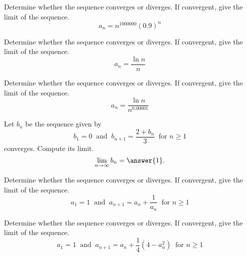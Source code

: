 \documentclass{ximera}
\begin{document}
\begin{exercise}
Determine whether the sequence converges or diverges. If convergent, give the limit of the sequence. 
\[ a_n = n^{1000000} (0.9)^n \]
\begin{multipleChoice}
\end{multipleChoice}
\end{exercise}

\begin{exercise}
Determine whether the sequence converges or diverges. If convergent, give the limit of the sequence. 
\[ a_n = \frac{\ln n}{n} \]
\begin{multipleChoice}
\end{multipleChoice}
\end{exercise}

\begin{exercise}
Determine whether the sequence converges or diverges. If convergent, give the limit of the sequence. 
\[ a_n = \frac{\ln n}{n^{0.00001}} \]
\begin{multipleChoice}
\end{multipleChoice}
\end{exercise}


\begin{exercise}
Let $b_n$ be the sequence given by
\[ b_1 = 0 \ \text{ and } \ b_{n+1} = \frac{2 + b_n}{3} \ \text{ for } n \geq 1 \]
converges. Compute its limit.
\[ \lim_{n \rightarrow \infty} b_n = \answer{1}. \]
\end{exercise}

\begin{exercise}
Determine whether the sequence converges or diverges. If convergent, give the limit of the sequence. 
\[ a_1 = 1 \ \text{ and } \ a_{n+1} = a_n + \frac{1}{a_n} \ \text{ for } n \geq 1 \]
\begin{multipleChoice}
\end{multipleChoice}
\end{exercise}

\begin{exercise}
Determine whether the sequence converges or diverges. If convergent, give the limit of the sequence. 
\[ a_1 = 1 \ \text{ and } \ a_{n+1} = a_n + \frac{1}{4} (4 - a_n^2) \ \text{ for } n \geq 1 \]
\begin{multipleChoice}
\end{multipleChoice}
\end{exercise}
\end{document}
